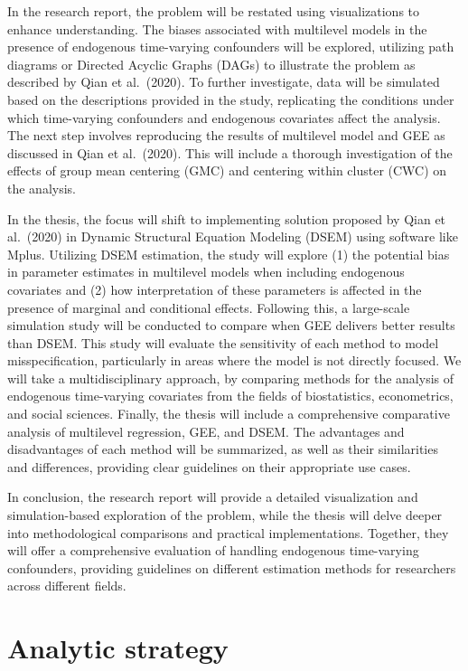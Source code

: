\documentclass[
  12pt,
  a4paper,
]{article}
\begin{document}
In the research report, the problem will be restated using
visualizations to enhance understanding. The biases associated with
multilevel models in the presence of endogenous time-varying confounders
will be explored, utilizing path diagrams or Directed Acyclic Graphs
(DAGs) to illustrate the problem as described by Qian et al.~(2020). To
further investigate, data will be simulated based on the descriptions
provided in the study, replicating the conditions under which
time-varying confounders and endogenous covariates affect the analysis.
The next step involves reproducing the results of multilevel model and
GEE as discussed in Qian et al.~(2020). This will include a thorough
investigation of the effects of group mean centering (GMC) and centering
within cluster (CWC) on the analysis.

In the thesis, the focus will shift to implementing solution proposed by
Qian et al.~(2020) in Dynamic Structural Equation Modeling (DSEM) using
software like Mplus. Utilizing DSEM estimation, the study will explore
(1) the potential bias in parameter estimates in multilevel models when
including endogenous covariates and (2) how interpretation of these
parameters is affected in the presence of marginal and conditional
effects. Following this, a large-scale simulation study will be
conducted to compare when GEE delivers better results than DSEM. This
study will evaluate the sensitivity of each method to model
misspecification, particularly in areas where the model is not directly
focused. We will take a multidisciplinary approach, by comparing methods
for the analysis of endogenous time-varying covariates from the fields
of biostatistics, econometrics, and social sciences. Finally, the thesis
will include a comprehensive comparative analysis of multilevel
regression, GEE, and DSEM. The advantages and disadvantages of each
method will be summarized, as well as their similarities and
differences, providing clear guidelines on their appropriate use cases.

In conclusion, the research report will provide a detailed visualization
and simulation-based exploration of the problem, while the thesis will
delve deeper into methodological comparisons and practical
implementations. Together, they will offer a comprehensive evaluation of
handling endogenous time-varying confounders, providing guidelines on
different estimation methods for researchers across different fields.

\hypertarget{analytic-strategy}{%
\section{Analytic strategy}\label{analytic-strategy}}
\end{document}
